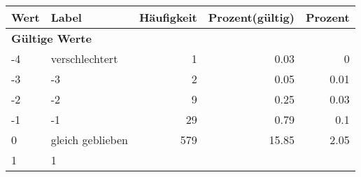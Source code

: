     \begin{longtable}{lXrrr}
     \toprule
     \textbf{Wert} & \textbf{Label} & \textbf{Häufigkeit} & \textbf{Prozent(gültig)} & \textbf{Prozent} \\
     \endhead
     \midrule
     \multicolumn{5}{l}{\textbf{Gültige Werte}}\\

     -4 &
     \multicolumn{1}{X}{ verschlechtert   } &


       \num{1} &
       \num[round-mode=places,round-precision=2]{0,03} &
         \num[round-mode=places,round-precision=2]{0} \\

     -3 &
     \multicolumn{1}{X}{ -3   } &


       \num{2} &
       \num[round-mode=places,round-precision=2]{0,05} &
         \num[round-mode=places,round-precision=2]{0,01} \\

     -2 &
     \multicolumn{1}{X}{ -2   } &


       \num{9} &
       \num[round-mode=places,round-precision=2]{0,25} &
         \num[round-mode=places,round-precision=2]{0,03} \\

     -1 &
     \multicolumn{1}{X}{ -1   } &


       \num{29} &
       \num[round-mode=places,round-precision=2]{0,79} &
         \num[round-mode=places,round-precision=2]{0,1} \\

     0 &
     \multicolumn{1}{X}{ gleich geblieben   } &


       \num{579} &
       \num[round-mode=places,round-precision=2]{15,85} &
         \num[round-mode=places,round-precision=2]{2,05} \\

     1 &
     \multicolumn{1}{X}{ 1   } &



\end{longtable}
